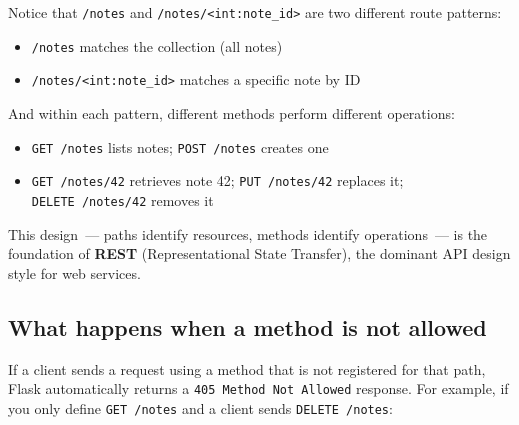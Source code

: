 \noindent{}Notice that \texttt{/notes} and \texttt{/}\allowbreak{}\texttt{notes/}\allowbreak{}\texttt{\textless{}int:note\_id\textgreater{}} are two different route patterns:

\begin{itemize}
\tightlist
\item
  \texttt{/notes} matches the collection (all notes)
\item
  \texttt{/}\allowbreak{}\texttt{notes/}\allowbreak{}\texttt{\textless{}int:note\_id\textgreater{}} matches a specific note by ID
\end{itemize}

\noindent{}And within each pattern, different methods perform different operations:

\begin{itemize}
\tightlist
\item
  \texttt{GET\ /notes} lists notes; \texttt{POST\ /notes} creates one
\item
  \texttt{GET\ /notes/42} retrieves note 42; \texttt{PUT\ /notes/42} replaces it; \texttt{DELETE\ /notes/42} removes it
\end{itemize}

\noindent{}This design~--- paths identify resources, methods identify operations~--- is the foundation of \textbf{REST} (Representational State Transfer), the dominant API design style for web services.

\subsection*{What happens when a method is not allowed}\label{04-request-handling-paths:what-happens-when-a-method-is-not-allowed}

If a client sends a request using a method that is not registered for that path, Flask automatically returns a \texttt{405\ Method\ Not\ Allowed} response. For example, if you only define \texttt{GET\ /notes} and a client sends \texttt{DELETE\ /notes}:

\begin{codebox}[short]

\begin{Shaded}
\begin{Highlighting}[]
 
\end{Highlighting}
\end{Shaded}

\end{codebox}

